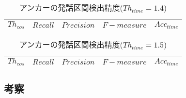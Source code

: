\begin{table}[H]
  \begin{center}
    \caption{アンカーの発話区間検出精度($Th_{time}=1.4$) \label{table:result_get_anchor14}}
    \begin{tabular}{|c||c|c|c|c|} \hline
      $Th_{cos}$ & $Recall$ & $Precision$ & $F-measure$ & $Acc_{time}$\\ \hline


    \end{tabular}
  \end{center}
\end{table}

\begin{table}[H]
  \begin{center}
    \caption{アンカーの発話区間検出精度($Th_{time}=1.5$) \label{table:result_get_anchor15}}
    \begin{tabular}{|c||c|c|c|c|} \hline
      $Th_{cos}$ & $Recall$ & $Precision$ & $F-measure$ & $Acc_{time}$\\ \hline


    \end{tabular}
  \end{center}
\end{table}
\subsection{考察}

